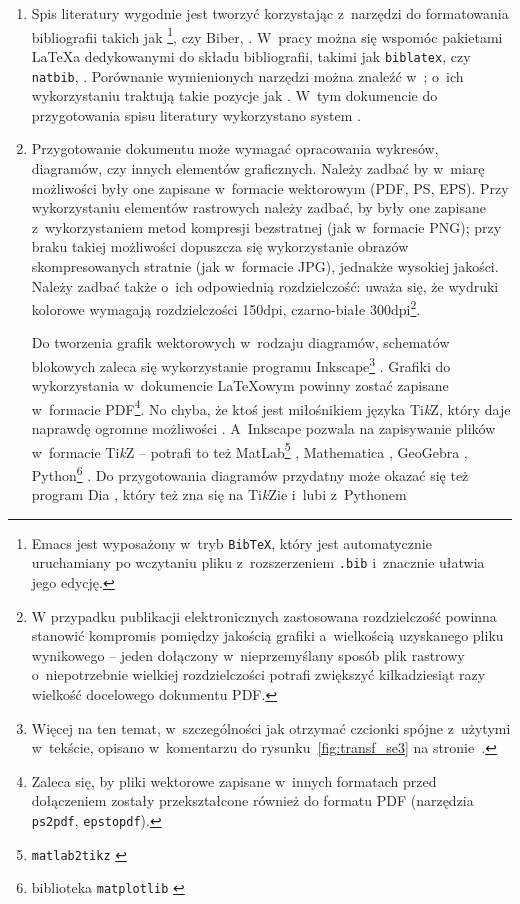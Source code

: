\begin{enumerate}
\item \label{spis_literatury} Spis literatury wygodnie jest tworzyć korzystając z~narzędzi do formatowania bibliografii takich jak \BibTeX\footnote{Emacs jest wyposażony w~tryb \texttt{BibTeX}, który jest automatycznie uruchamiany po wczytaniu pliku z~rozszerzeniem \texttt{.bib} i~znacznie ułatwia jego edycję.}, \cite{bibtex_ctan,wikibibtex,bibtex} czy Biber, \cite{biber_ctan,wikibiber,biber}. W~pracy można się wspomóc pakietami \LaTeX{}a dedykowanymi do składu bibliografii, takimi jak \verb+biblatex+, \cite{biblatex} czy \verb+natbib+, \cite{natbib}. Porównanie wymienionych narzędzi można znaleźć w~\cite{bib_porownanie}; o~ich wykorzystaniu traktują takie pozycje jak \cite{bib_in_latex_overleaf,bibtex_overleaf,biblatex_overleaf,biblatex_overleaf2,biber_man,natbib_overleaf}. W~tym dokumencie do przygotowania spisu literatury wykorzystano system \BibTeX.
  
\item \label{grafika_narzedzia} Przygotowanie dokumentu może wymagać opracowania wykresów, diagramów, czy innych elementów graficznych. Należy zadbać by w~miarę możliwości były one zapisane w~formacie wektorowym (PDF, PS, EPS). Przy wykorzystaniu elementów rastrowych należy zadbać, by były one zapisane z~wykorzystaniem metod kompresji bezstratnej (jak w~formacie PNG); przy braku takiej możliwości dopuszcza się wykorzystanie obrazów skompresowanych stratnie (jak w~formacie JPG), jednakże wysokiej jakości. Należy zadbać także o~ich odpowiednią rozdzielczość: uważa się, że wydruki kolorowe wymagają rozdzielczości 150dpi, czarno-białe 300dpi\footnote{W przypadku publikacji elektronicznych zastosowana rozdzielczość powinna stanowić kompromis pomiędzy jakością grafiki a~wielkością uzyskanego pliku wynikowego -- jeden dołączony w~nieprzemyślany sposób plik rastrowy o~niepotrzebnie wielkiej rozdzielczości potrafi zwiększyć kilkadziesiąt razy wielkość docelowego dokumentu PDF.}. 

  Do tworzenia grafik wektorowych w~rodzaju diagramów, schematów blokowych zaleca się wykorzystanie programu Inkscape\footnote{Więcej na ten temat, w~szczególności jak otrzymać czcionki spójne z~użytymi w~tekście, opisano w~komentarzu do rysunku~\ref{fig:transf_se3} na stronie~\pageref{fig:transf_se3}.} \cite{inkscape,inkscape_preze,inkscape_wiki}. Grafiki do wykorzystania w~dokumencie \LaTeX{}owym powinny zostać zapisane w~formacie PDF\footnote{Zaleca się, by pliki wektorowe zapisane w~innych formatach przed dołączeniem zostały przekształcone również do formatu PDF (narzędzia \texttt{ps2pdf}, \texttt{epstopdf}).}. No chyba, że ktoś jest miłośnikiem języka Ti{\it k}Z, który daje naprawdę ogromne możliwości \cite{tikz_pol, tikz_preze, tikz_overleaf, tikz_wiki}. A~Inkscape pozwala na zapisywanie plików w~formacie Ti{\it k}Z -- potrafi to też MatLab\footnote{\texttt{matlab2tikz} \cite{matlab2tikz}} \cite{matlab}, Mathematica  \cite{wolMat}, GeoGebra \cite{geogebra}, Python\footnote{biblioteka \texttt{matplotlib} \cite{matplotlib}} \cite{python}. Do przygotowania diagramów przydatny może okazać się też program Dia \cite{dia,dia_wiki}, który też zna się na  Ti{\it k}Zie i~lubi z~Pythonem \smiley


\end{enumerate}

